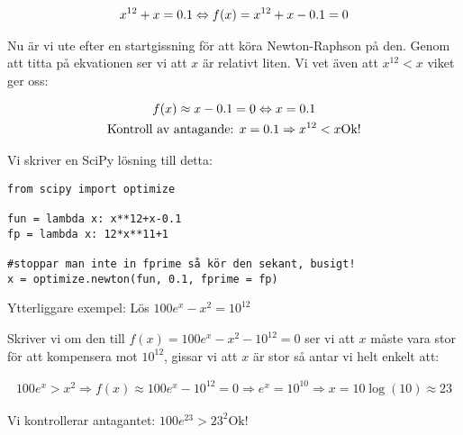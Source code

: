 \begin{equation*}
  \begin{gathered}
    x^{12}+x=0.1\Leftrightarrow f(x)=x^{12}+x-0.1=0
  \end{gathered}
\end{equation*}\par
\noindent Nu är vi ute efter en startgissning för att köra Newton-Raphson på den. Genom att titta på ekvationen ser vi att $x$ är relativt liten. Vi vet även att $x^{12}<x$ viket ger oss:

\begin{equation*}
  \begin{gathered}
    f(x)\approx x-0.1=0\Leftrightarrow x = 0.1\\
    \text{Kontroll av antagande: } x = 0.1\Rightarrow x^{12}<x\text{Ok!}
  \end{gathered}
\end{equation*}
\par
\noindent Vi skriver en SciPy lösning till detta:

\begin{verbatim}
from scipy import optimize

fun = lambda x: x**12+x-0.1
fp = lambda x: 12*x**11+1

#stoppar man inte in fprime så kör den sekant, busigt!
x = optimize.newton(fun, 0.1, fprime = fp) 
\end{verbatim}
\par\bigskip
\noindent Ytterliggare exempel: Lös $100e^x-x^2=10^{12}$\par
\noindent Skriver vi om den till $f(x) = 100e^x-x^2-10^{12}=0$ ser vi att $x$ måste vara stor för att kompensera mot $10^{12}$, gissar vi att $x$ är stor så antar vi helt enkelt att:

\begin{equation*}
  \begin{gathered}
    100e^x>x^2\Rightarrow f(x)\approx 100e^x-10^{12}=0\Rightarrow e^x = 10^{10}\Rightarrow x = 10\log(10)\approx 23
  \end{gathered}
\end{equation*}\par
\noindent Vi kontrollerar antagantet: $100e^{23}>23^2 \text{Ok!}$






